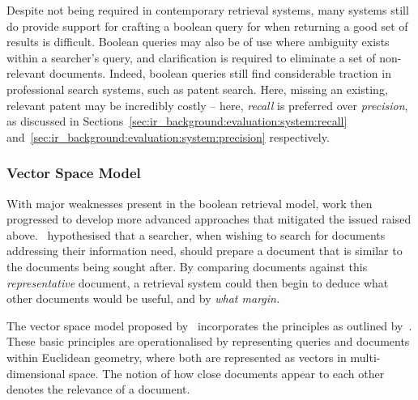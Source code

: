 Despite not being required in contemporary retrieval systems, many systems still do provide support for crafting a boolean query for when returning a good set of results is difficult. Boolean queries may also be of use where ambiguity exists within a searcher's query, and clarification is required to eliminate a set of non-relevant documents. Indeed, boolean queries still find considerable traction in professional search systems, such as patent search. Here, missing an existing, relevant patent may be incredibly costly -- here, \emph{recall} is preferred over \emph{precision}, as discussed in Sections~\ref{sec:ir_background:evaluation:system:recall} and~\ref{sec:ir_background:evaluation:system:precision} respectively.

\subsubsection{Vector Space Model}
With major weaknesses present in the boolean retrieval model, work then progressed to develop more advanced approaches that mitigated the issued raised above.~\cite{luhn1957ranking_query} hypothesised that a searcher, when wishing to search for documents addressing their information need, should prepare a document that is similar to the documents being sought after. By comparing documents against this \emph{representative} document, a retrieval system could then begin to deduce what other documents would be useful, and by \emph{what margin.}

The vector space model proposed by~\cite{salton1975vsm} incorporates the principles as outlined by~\cite{luhn1957ranking_query}. These basic principles are operationalised by representing queries and documents within Euclidean geometry, where both are represented as vectors in multi-dimensional space. The notion of how close documents appear to each other denotes the relevance of a document.

